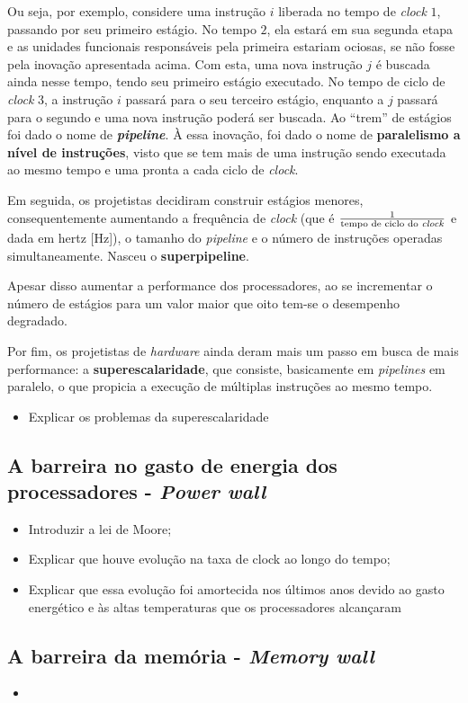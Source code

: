     	Ou seja, por exemplo, 
    	considere uma instrução $i$ liberada no tempo de \textit{clock} $1$, 
    	passando por seu primeiro estágio. No tempo $2$, ela estará em sua
    	segunda etapa e as unidades funcionais responsáveis pela primeira 
    	estariam ociosas, se não fosse pela inovação apresentada acima. Com 
    	esta, uma nova instrução $j$ é buscada ainda nesse tempo, tendo 
    	seu primeiro estágio executado. No tempo de ciclo de \textit{clock} 3,
    	a instrução $i$ passará para o seu terceiro estágio, enquanto a $j$
    	passará para o segundo e uma nova instrução poderá ser buscada. Ao 
    	``trem'' de estágios foi dado o nome de \textbf{\textit{pipeline}}. À essa 
    	inovação, foi dado o nome de \textbf{paralelismo a nível de instruções}, 
    	visto que se tem mais de uma instrução sendo executada ao mesmo tempo e 
    	uma pronta a cada ciclo de \textit{clock}.
    	
    	Em seguida, os projetistas decidiram construir estágios menores, 
    	consequentemente aumentando a frequência de \textit{clock} (que é 
	    	$\frac{1}{\text{tempo de ciclo do \textit{clock}}}$ 
    	e dada em hertz [Hz]), o tamanho do \textit{pipeline} e o número de 
    	instruções operadas simultaneamente. Nasceu o \textbf{superpipeline}. 
    	
    	Apesar disso aumentar a performance dos processadores, ao se 
    	incrementar o número de estágios para um valor maior que  oito tem-se
    	o desempenho degradado.
    	
    	Por fim, os projetistas de \textit{hardware} ainda deram mais um 
    	passo em busca de mais performance: a \textbf{superescalaridade}, 
    	que consiste, basicamente em \textit{pipelines} em paralelo, o que 
    	propicia a execução de múltiplas instruções ao mesmo tempo.
    
        \begin{itemize}
            \item Explicar os problemas da superescalaridade
        \end{itemize}
    
    \subsection{A barreira no gasto de energia dos processadores - \textit{Power wall}}
    
        \begin{itemize}
            \item Introduzir a lei de Moore;
            \item Explicar que houve evolução na taxa de clock ao longo do tempo;
            \item Explicar que essa evolução foi amortecida nos últimos anos devido 
            ao gasto energético e às altas temperaturas que os processadores alcançaram 
        \end{itemize}
    
    \subsection{A barreira da memória - \textit{Memory wall}}
    
	    
	    \begin{itemize}
	    	\item 
	    \end{itemize}